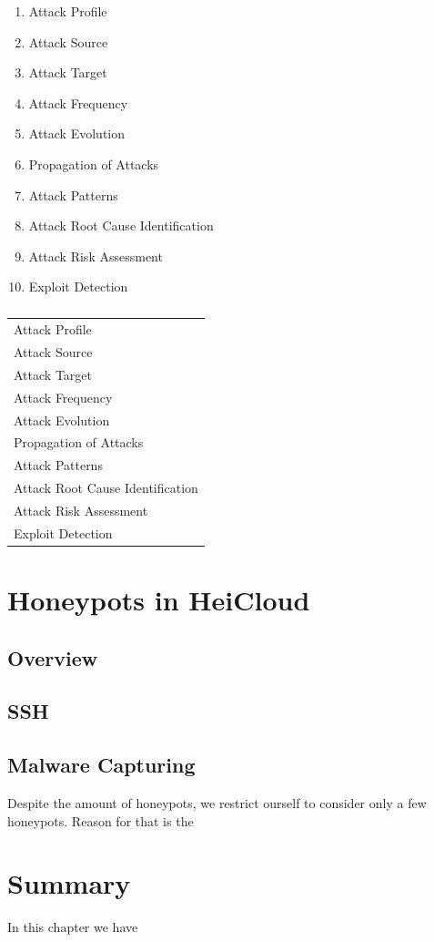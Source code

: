 \begin{enumerate}
    \item Attack Profile
    \item Attack Source
    \item Attack Target
    \item Attack Frequency
    \item Attack Evolution
    \item Propagation of Attacks
    \item Attack Patterns
    \item Attack Root Cause Identification
    \item Attack Risk Assessment
    \item Exploit Detection
\end{enumerate}

\begin{table}[h]
    \centering
    \caption{}
    \begin{tabularx}{\linewidth}{l}
        \toprule
        Attack Profile\\
        Attack Source\\
        Attack Target\\
        Attack Frequency\\
        Attack Evolution\\
        Propagation of Attacks\\
        Attack Patterns\\
        Attack Root Cause Identification\\
        Attack Risk Assessment\\
        Exploit Detection\\
        \bottomrule
    \end{tabularx}
    \label{tab:overview-data-analysis}
\end{table}


\section{Honeypots in HeiCloud}
\label{sec:honeypots-heicloud}


\subsection{Overview}

\subsection{SSH}

\subsection{Malware Capturing}




Despite the amount of honeypots, we restrict ourself to consider only a few honeypots.
Reason for that is the 

\section{Summary}

In this chapter we have 